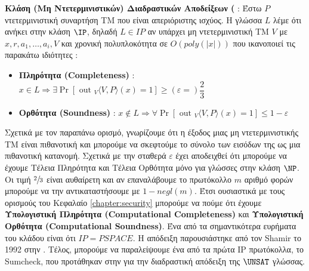 \begin{definition}
\textbf{Κλάση (Μη Ντετερμινιστικών) Διαδραστικών Αποδείξεων (} : Έστω $P$ ντετερμινιστική συναρτήση ΤΜ που είναι απεριόριστης ισχύος. Η γλώσσα $L$ λέμε ότι ανήκει στην κλάση $\IP$, δηλαδή $L \in IP$ αν υπάρχει μη ντετερμινιστική ΤΜ $V$ με $x, r, a_{1}, \ldots, a_{i}, V$ και χρονική πολυπλοκότητα σε $O(poly(|x|))$ που ικανοποιεί τις παρακάτω ιδιότητες :
\begin{itemize}
    \item \textbf{Πληρότητα (Completeness)} : $x \in L \Rightarrow \exists \operatorname{Pr}\left[\text { out }_{V}\langle V, P\rangle(x)=1\right] \geq (ε=) \dfrac{2}{3}$
    \item \textbf{Ορθότητα (Soundness)} : $x \notin L \Rightarrow \forall \operatorname{Pr}\left[\text { out }_{V}\langle V, P\rangle(x)=1\right] \leq 1 - ε$
\end{itemize}
\end{definition}

Σχετικά με τον παραπάνω ορισμό, γνωρίζουμε ότι η έξοδος μιας μη ντετερμινιστικής ΤΜ είναι πιθανοτική και μπορούμε να σκεφτούμε το σύνολο των εισόδων της ως μια πιθανοτική κατανομή. Σχετικά με την σταθερά $ε$ έχει αποδειχθεί ότι μπορούμε να έχουμε Τέλεια Πληρότητα και Τέλεια Ορθότητα μόνο για γλώσσες στην κλάση $\NP$. Οι τιμή $\sfrac{2}{3}$ είναι αυθαίρετη και αν επαναλάβουμε το πρωτόκολλο $m$ αριθμό φορών μπορούμε να την αντικαταστήσουμε με $1-negl(m)$. Έτσι ουσιαστικά με τους ορισμούς του Κεφαλαίο \ref{chapter:security} μπορούμε να πούμε ότι έχουμε \textbf{Υπολογιστική Πληρότητα (Computational Completeness)} και \textbf{Υπολογιστική Ορθότητα (Computational Soundness)}. Ένα από τα σημαντικότερα ευρήματα του κλάδου είναι ότι $IP=PSPACE$. Η απόδειξη παρουσιάστηκε από τον Shamir το 1992 στην \cite{shamir1992ip}. Τέλος, μπορούμε να παραλείψουμε ένα από τα πρώτα IP πρωτόκολλα, το Sumcheck, που προτάθηκαν στην \cite{lund1992algebraic} για την διαδραστική απόδειξη της $\UNSAT$ γλώσσας.